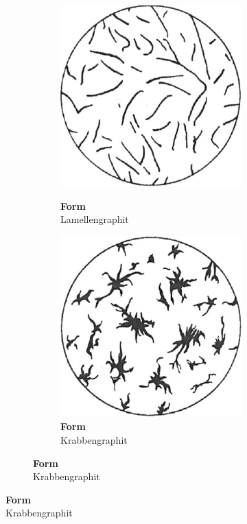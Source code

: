 \documentclass[
fontsize=10pt, 
listof = totoc,
parskip = half	
]{report}
\newcommand{\uproman}[1]{\uppercase\expandafter{\romannumeral#1}}
\begin{document}
\begin{figure}[h]
	\begin{subfigure}{1.0\linewidth}
		\begin{subfigure}{0.33\textwidth}
			\centering
			\includegraphics[scale=0.25]{pics/graphit_form1}
			\label{fig:LamellenGraphit}
			\caption*{\textbf{Form \uproman{1}}\\Lamellengraphit}
		\end{subfigure}\hfill
		\begin{subfigure}{0.33\textwidth}
			\centering
			\includegraphics[scale=0.25]{pics/graphit_form2}
			\caption*{\textbf{Form \uproman{2}}\\Krabbengraphit}

\end{subfigure}
\end{subfigure}
\end{figure}
\end{document}

